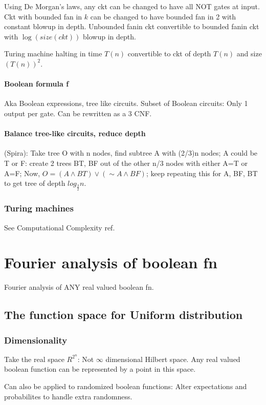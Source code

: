 \documentclass[oneside, article]{memoir}
\begin{document}
Using De Morgan's laws, any ckt can be changed to have all NOT gates at input. Ckt with bounded fan in $k$ can be changed to have bounded fan in 2 with constant blowup in depth. Unbounded fanin ckt convertible to bounded fanin ckt with $\log(size(ckt))$ blowup in depth.

Turing machine halting in time $T(n)$ convertible to ckt of depth $T(n)$ and size $(T(n))^{2}$.

\subsubsection{Boolean formula f}
Aka Boolean expressions, tree like circuits. Subset of Boolean circuits: Only 1 output per gate. Can be rewritten as a 3 CNF.

\subsubsection{Balance tree-like circuits, reduce depth}
(Spira): Take tree O with n nodes, find subtree A with (2/3)n nodes; A could be T or F: create 2 trees BT, BF out of the other n/3 nodes with either A=T or A=F; Now, $O=(A \wedge BT) \vee (\sim A \wedge BF)$; keep repeating this for A, BF, BT to get tree of depth $log_{\frac{3}{2}}n$.

\subsection{Turing machines}
See Computational Complexity ref.

\chapter{Fourier analysis of boolean fn}
Fourier analysis of ANY real valued boolean fn. 

\section{The function space for Uniform distribution}
\subsection{Dimensionality}
Take the real space $R^{2^{n}}$: Not $\infty$ dimensional Hilbert space. Any real valued boolean function can be represented by a point in this space.

Can also be applied to randomized boolean functions: Alter expectations and probabilites to handle extra randomness.
\end{document}
